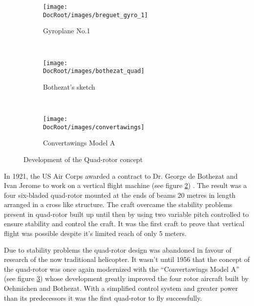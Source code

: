 \begin{figure}[h]
	\centering
	\begin{subfigure}[b]{0.35\textwidth}
		\texttt{[image: \\DocRoot/images/breguet\_gyro\_1]}
		\caption{Gyroplane No.1}
		\label{fig:Gyroplane No.1}
	\end{subfigure}%
	~ %
	\begin{subfigure}[b]{0.3\textwidth}
		\texttt{[image: \\DocRoot/images/bothezat\_quad]}
		\caption{Bothezat’s sketch}
		\label{fig:Bothezat’s sketch}
	\end{subfigure}
	~ %
	\begin{subfigure}[b]{0.3\textwidth}
		\texttt{[image: \\DocRoot/images/convertawings]}
		\caption{Convertawings Model A}
		\label{fig:Convertawings Model A}
	\end{subfigure}
	\caption{Development of the Quad-rotor concept \cite{Principles_of_helicopter_aerodynamics}}\label{fig:Development of the Quad-rotor concept}
\end{figure}


In  1921, the US Air Corps awarded a contract to Dr. George de Bothezat and Ivan Jerome to work on a vertical flight machine (see figure \ref{fig:Bothezat’s sketch}) \cite{Principles_of_helicopter_aerodynamics}. The result was a four six-bladed quad-rotor mounted at the ends of beams 20 metres in length arranged in a cross like structure. The craft overcame the stability problems present in quad-rotor built up until then by using two variable pitch controlled to ensure stability and control the craft. It was the first craft to prove that vertical flight  was possible despite it's limited reach of only 5 meters.

Due to stability problems the quad-rotor design   was abandoned in favour of research of the now traditional helicopter. It wasn't until 1956 that the concept of the quad-rotor was once again modernized with the “Convertawings Model A” \cite{Helicopters_and_autogiros(Convertawings_Model_A)} (see figure \ref{fig:Convertawings Model A}) whose development greatly improved the four rotor aircraft built by Oehmichen and Bothezat. With a simplified control system and greater power than its predecessors it was the first quad-rotor to fly successfully.


